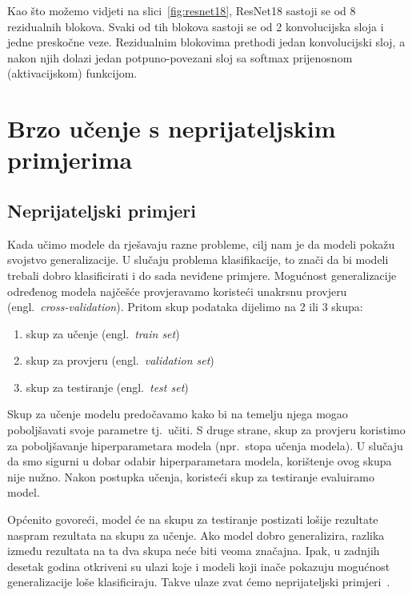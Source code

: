 \documentclass[times, utf8, zavrsni, numeric]{fer}
\begin{document}
Kao što možemo vidjeti na slici~\ref{fig:resnet18}, ResNet18 sastoji se od 8 rezidualnih blokova. Svaki od tih blokova sastoji se od 2 konvolucijska sloja i jedne preskočne veze.
Rezidualnim blokovima prethodi jedan konvolucijski sloj, a nakon njih dolazi jedan potpuno-povezani sloj sa softmax prijenosnom (aktivacijskom) funkcijom.

\chapter{Brzo učenje s neprijateljskim primjerima}

\section{Neprijateljski primjeri}

Kada učimo modele da rješavaju razne probleme, cilj nam je da modeli pokažu svojstvo generalizacije. 
U slučaju problema klasifikacije, to znači da bi modeli trebali dobro klasificirati i do sada neviđene primjere.
Mogućnost generalizacije određenog modela najčešće provjeravamo koristeći unakrsnu provjeru (engl.\ \textit{cross-validation}).
Pritom skup podataka dijelimo na 2 ili 3 skupa: 

\begin{enumerate}
    \item skup za učenje (engl.\ \textit{train set})
    \item skup za provjeru (engl.\ \textit{validation set})
    \item skup za testiranje (engl.\ \textit{test set})
\end{enumerate}

Skup za učenje modelu predočavamo kako bi na temelju njega mogao poboljšavati svoje parametre tj.\ učiti. 
S druge strane, skup za provjeru koristimo za poboljšavanje hiperparametara modela (npr.\ stopa učenja modela). 
U slučaju da smo sigurni u dobar odabir hiperparametara modela, korištenje ovog skupa nije nužno. 
Nakon postupka učenja, koristeći skup za testiranje evaluiramo model.

Općenito govoreći, model će na skupu za testiranje postizati lošije rezultate naspram rezultata na skupu za učenje. 
Ako model dobro generalizira, razlika između rezultata na ta dva skupa neće biti veoma značajna. 
Ipak, u zadnjih desetak godina otkriveni su ulazi koje i modeli koji inače pokazuju mogućnost generalizacije loše klasificiraju.
Takve ulaze zvat ćemo neprijateljski primjeri~\cite{goodfellow2014explaining}.
\end{document}
